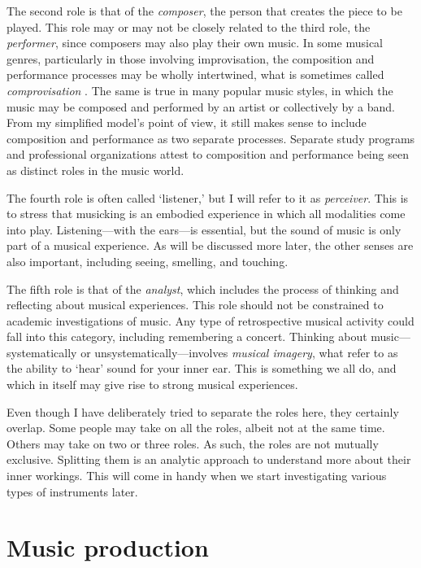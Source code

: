 The second role is that of the \emph{composer}, the person that creates the piece to be played. This role may or may not be closely related to the third role, the \emph{performer}, since composers may also play their own music. In some musical genres, particularly in those involving improvisation, the composition and performance processes may be wholly intertwined, what is sometimes called \emph{comprovisation} \citep{dudas_comprovisation_2010}. The same is true in many popular music styles, in which the music may be composed and performed by an artist or collectively by a band. From my simplified model's point of view, it still makes sense to include composition and performance as two separate processes. Separate study programs and professional organizations attest to composition and performance being seen as distinct roles in the music world.

The fourth role is often called `listener,' but I will refer to it as \emph{perceiver}. This is to stress that musicking is an embodied experience in which all modalities come into play. Listening---with the ears---is essential, but the sound of music is only part of a musical experience. As will be discussed more later, the other senses are also important, including seeing, smelling, and touching.

The fifth role is that of the \emph{analyst}, which includes the process of thinking and reflecting about musical experiences. This role should not be constrained to academic investigations of music. Any type of retrospective musical activity could fall into this category, including remembering a concert. Thinking about music---systematically or unsystematically---involves \emph{musical imagery}, what \citet{godoy_musical_2001} refer to as the ability to `hear' sound for your inner ear. This is something we all do, and which in itself may give rise to strong musical experiences.

Even though I have deliberately tried to separate the roles here, they certainly overlap. Some people may take on all the roles, albeit not at the same time. Others may take on two or three roles. As such, the roles are not mutually exclusive. Splitting them is an analytic approach to understand more about their inner workings. This will come in handy when we start investigating various types of instruments later.


\section{Music production}

